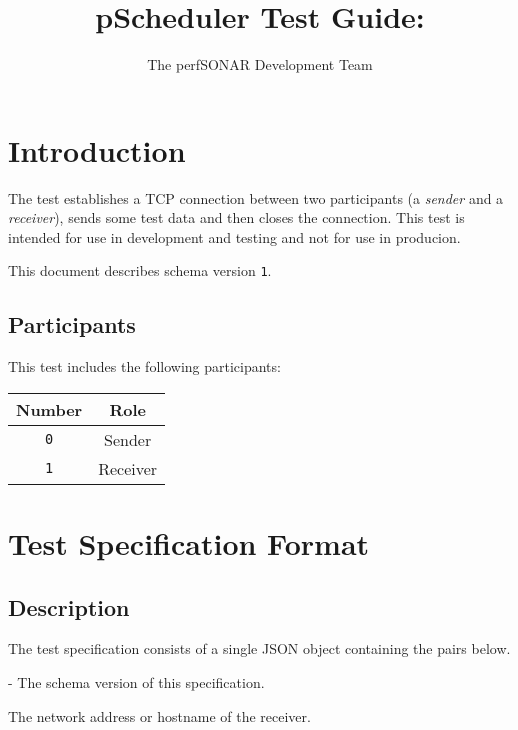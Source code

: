 \documentclass[10pt]{article}
\title{pScheduler Test Guide: {\it \testname}}
\author{The perfSONAR Development Team}
\begin{document}
\maketitle


%
%

\section{Introduction}

The {\tt \testname} test establishes a TCP connection between two
participants (a {\it sender} and a {\it receiver}), sends some test
data and then closes the connection.  This test is intended for use in
development and testing and not for use in producion.

This document describes schema version {\tt 1}.

\subsection{Participants}

This test includes the following participants:

\begin{center}
\begin{tabular}{|c|c|}
\hline
{\bf Number} & {\bf Role} \\
\hline
{\tt 0} & Sender \\
{\tt 1} & Receiver \\
\hline
\end{tabular}
\end{center}



%
%

\section{Test Specification Format}

\subsection{Description}

The test specification consists of a single JSON object containing the
pairs below.  \seejson

 - The schema version of this specification.

 The network address or hostname of the receiver.
\end{document}
